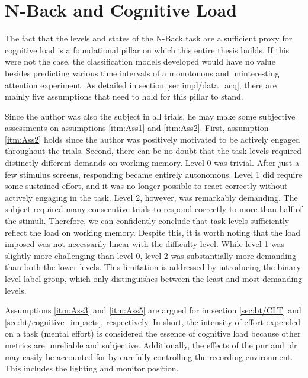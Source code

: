 \section{N-Back and Cognitive Load}

The fact that the levels and states of the N-Back task are a sufficient proxy for cognitive load is a foundational pillar on which this entire thesis builds. If this were not the case, the classification models developed would have no value besides predicting various time intervals of a monotonous and uninteresting attention experiment. As detailed in section \ref{sec:impl/data_acq}, there are mainly five assumptions that need to hold for this pillar to stand. 

Since the author was also the subject in all trials, he may make some subjective assessments on assumptions \ref{itm:Ass1} and \ref{itm:Ass2}. First, assumption \ref{itm:Ass2} holds since the author was positively motivated to be actively engaged throughout the trials. Second, there can be no doubt that the task levels required distinctly different demands on working memory. Level 0 was trivial. After just a few stimulus screens, responding became entirely autonomous. Level 1 did require some sustained effort, and it was no longer possible to react correctly without actively engaging in the task. Level 2, however, was remarkably demanding. The subject required many consecutive trials to respond correctly to more than half of the stimuli. Therefore, we can confidently conclude that task levels sufficiently reflect the load on working memory. Despite this, it is worth noting that the load imposed was not necessarily linear with the difficulty level. While level 1 was slightly more challenging than level 0, level 2 was substantially more demanding than both the lower levels. This limitation is addressed by introducing the binary level label group, which only distinguishes between the least and most demanding levels. %

Assumptions \ref{itm:Ass3} and \ref{itm:Ass5} are argued for in section \ref{sec:bt/CLT} and \ref{sec:bt/cognitive_impacts}, respectively. In short, the intensity of effort expended on a task (mental effort) is considered the essence of cognitive load \cite{hamilton1979} because other metrics are unreliable and subjective. Additionally, the effects of the \acrshort{pnr} and \acrshort{plr} may easily be accounted for by carefully controlling the recording environment. This includes the lighting and monitor position.

